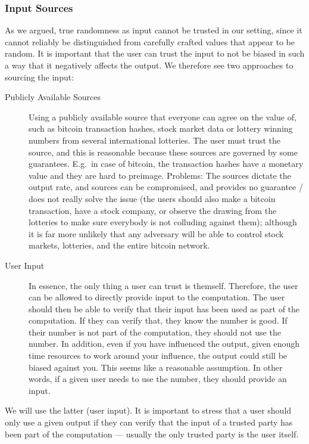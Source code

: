 \subsubsection{Input Sources}
As we argued, true randomness as input cannot be trusted in our setting, since it cannot reliably be distinguished from carefully crafted values that appear to be random.
It is important that the user can trust the input to not be biased in such a way that it negatively affects the output. We therefore see two approaches to sourcing the input:

\begin{description}
    \item[Publicly Available Sources] Using a publicly available source that everyone can agree on the value of, such as bitcoin transaction hashes, stock market data or lottery winning numbers from several international lotteries.
The user must trust the source, and this is reasonable because these sources are governed by some guarantees. E.g.\ in case of bitcoin, the transaction hashes have a monetary value and they are hard to preimage.
Problems: The sources dictate the output rate, and sources can be compromised, and provides no guarantee / does not really solve the issue (the users should also make a bitcoin transaction, have a stock company, or observe the drawing from the lotteries to make sure everybody is not colluding against them); although it is far more unlikely that any adversary will be able to control stock markets, lotteries, and the entire bitcoin network. 

    \item[User Input] In essence, the only thing a user can trust is themself.
Therefore, the user can be allowed to directly provide input to the computation.
The user should then be able to verify that their input has been used as part of the computation.
If they can verify that, they know the number is good.
If their number is not part of the computation, they should not use the number.
 In addition, even if you have influenced the output, given enough time resources to work around your influence, the output could still be biased against you.
This seems like a reasonable assumption.
In other words, if a given user needs to use the number, they should provide an input.

\end{description}

We will use the latter (user input).
It is important to stress that a user should only use a given output if they can verify that the input of a trusted party has been part of the computation --- usually the only trusted party is the user itself.

